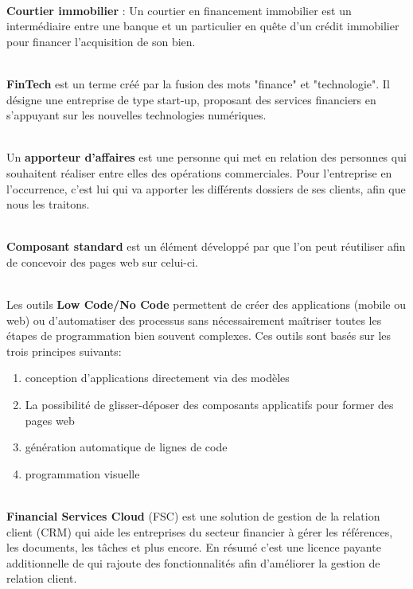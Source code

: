 \documentclass[12pt,oneside,noprintercorrection]{iut}
\begin{document}
   ~\\\indent \textbf{Courtier immobilier} : Un courtier en financement immobilier est un intermédiaire entre une banque et un particulier en quête d’un crédit immobilier pour financer l’acquisition de son bien.\newline


    ~\\\indent \textbf{FinTech} est un terme créé par la fusion des mots "finance" et "technologie". Il désigne une entreprise de type start-up, proposant des services financiers en s'appuyant sur les nouvelles technologies numériques. \newline


    ~\\\indent Un \textbf{apporteur d'affaires} est une personne qui met en relation des personnes qui souhaitent réaliser entre elles des opérations commerciales. Pour l'entreprise en l'occurrence, c'est lui qui va apporter les différents dossiers de ses clients, afin que nous les traitons.\newline


    ~\\\indent \textbf{Composant standard} est un élément développé par \slf{} que l'on peut réutiliser afin de concevoir des pages web sur celui-ci.\newline


     ~\\\indent Les outils \textbf{Low Code/No Code} permettent de créer des applications (mobile ou web) ou d’automatiser des processus sans nécessairement maîtriser toutes les étapes de programmation bien souvent complexes. Ces outils sont basés sur les trois principes suivants: 
    \begin{enumerate}
        \item conception d’applications directement via des modèles
        \item La possibilité de glisser-déposer des composants applicatifs pour former des pages web
        \item génération automatique de lignes de code
        \item programmation visuelle
    \end{enumerate}
    
    ~\\\indent \textbf{Financial Services Cloud} (FSC) est une solution de gestion de la relation client (CRM) qui aide les
entreprises du secteur financier à gérer les références, les documents, les tâches et plus
encore. En résumé c'est une licence payante additionnelle de \slf{} qui rajoute des
fonctionnalités afin d'améliorer la gestion de relation client.\newline
\end{document}
